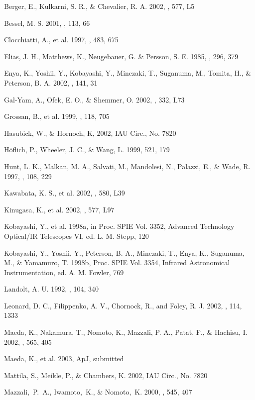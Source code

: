 \documentclass[10pt,preprint2]{aastex}
\begin{document}
\begin{references}

Berger, E., Kulkarni, S. R., \& Chevalier, R. A.
        2002, \apj, 577, L5

Bessel, M. S. 2001, \pasp, 113, 66

Clocchiatti, A., et al. 1997, \apj, 483, 675

Elias, J. H., Matthews, K., Neugebauer, G. \& Persson,
S. E. 1985, \apj, 296, 379

Enya, K., Yoshii, Y., Kobayashi, Y., Minezaki, T.,
Suganuma, M., Tomita, H., \& Peterson, B. A. 2002, \apjs, 141, 31

Gal-Yam, A., Ofek, E. O., \& Shemmer, O. 2002,
   \mnras, 332, L73

Grossan, B., et al. 1999, \aj, 118, 705

Hasubick, W., \& Hornoch, K, 2002, IAU Circ., No. 7820

H\"oflich, P., Wheeler, J. C., \& Wang, L. 1999, 521,
179

Hunt, L. K., Malkan, M. A., Salvati, M., Mandolesi,
   N., Palazzi, E., \& Wade, R. 1997, \apjs, 108, 229

Kawabata, K. S., et al. 2002, \apj, 580, L39

Kinugasa, K., et al. 2002, \apj, 577, L97

Kobayashi, Y., et al. 1998a, in Proc. SPIE Vol. 3352,
    Advanced Technology Optical/IR Telescopes VI, ed. L. M. Stepp, 120

Kobayashi, Y., Yoshii, Y., Peterson, B. A.,
    Minezaki, T., Enya, K., Suganuma, M., \& Yamamuro, T. 1998b,
    Proc. SPIE Vol. 3354, Infrared Astronomical
    Instrumentation, ed. A. M. Fowler, 769

Landolt, A. U. 1992, \aj, 104, 340

Leonard, D. C., Filippenko, A. V., Chornock, R., and
    Foley, R. J. 2002, \pasp, 114, 1333

Maeda, K., Nakamura, T., Nomoto, K., Mazzali, P. A.,
    Patat, F., \& Hachisu, I. 2002, \apj, 565, 405

Maeda, K., et al. 2003, ApJ, submitted

Mattila, S., Meikle, P., \& Chambers, K. 2002,
    IAU Circ., No. 7820

Mazzali,~P.~A., Iwamoto,~K., \& Nomoto,~K.
   2000,  \apj, 545, 407


\end{references}
\end{document}
